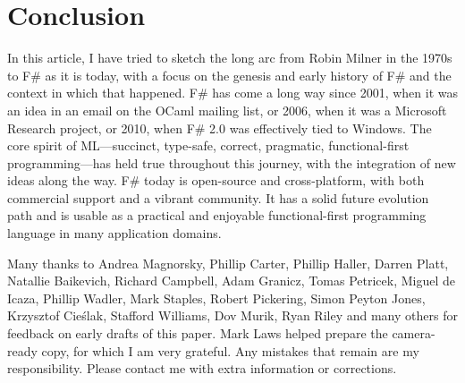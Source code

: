 \documentclass[acmsmall,screen]{acmart}
\begin{document}
\section*{Conclusion}

In this article, I have tried to sketch the long arc from Robin Milner in the 1970s to F\# as it
is today, with a focus on the genesis and early history of F\# and the context in which
that happened. F\# has come a long way since 2001, when it was an idea in
an email on the OCaml mailing list, or 2006, when it was a Microsoft Research project,
or 2010, when F\# 2.0 was effectively tied to Windows. The core spirit of ML---succinct,
type-safe, correct, pragmatic, functional-first programming---has held true throughout
this journey, with the integration of new ideas along the way.  F\# today is open-source
and cross-platform, with both commercial support and a vibrant community. It has a solid future
evolution path and is usable as a practical and enjoyable functional-first programming language in many application domains.  





\begin{acks}                            %

Many thanks to Andrea Magnorsky, Phillip Carter, Phillip Haller, Darren Platt, Natallie Baikevich, Richard Campbell, Adam Granicz, Tomas Petricek, Miguel de Icaza, Phillip Wadler, Mark Staples, Robert Pickering, Simon Peyton Jones, Krzysztof Cieślak, Stafford Williams, Dov Murik, Ryan Riley   and many others for feedback on early drafts of this paper.  Mark Laws helped prepare the camera-ready copy, for which I am very grateful. Any mistakes that remain are my responsibility. Please contact me with extra information or corrections.

\end{acks}





%
\end{document}
